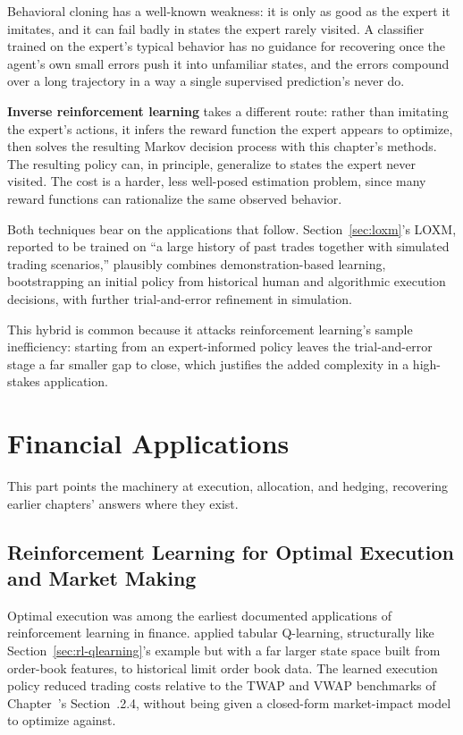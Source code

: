 \documentclass[../ai_in_finance]{subfiles}
\begin{document}
Behavioral cloning has a well-known weakness: it is only as good as the expert it imitates, and it can fail badly in states the expert rarely visited. A classifier trained on the expert's typical behavior has no guidance for recovering once the agent's own small errors push it into unfamiliar states, and the errors compound over a long trajectory in a way a single supervised prediction's never do.

\textbf{Inverse reinforcement learning} takes a different route: rather than imitating the expert's actions, it infers the reward function the expert appears to optimize, then solves the resulting Markov decision process with this chapter's methods. The resulting policy can, in principle, generalize to states the expert never visited. The cost is a harder, less well-posed estimation problem, since many reward functions can rationalize the same observed behavior.

Both techniques bear on the applications that follow. Section~\ref{sec:loxm}'s LOXM, reported to be trained on ``a large history of past trades together with simulated trading scenarios,'' plausibly combines demonstration-based learning, bootstrapping an initial policy from historical human and algorithmic execution decisions, with further trial-and-error refinement in simulation.

This hybrid is common because it attacks reinforcement learning's sample inefficiency: starting from an expert-informed policy leaves the trial-and-error stage a far smaller gap to close, which justifies the added complexity in a high-stakes application.

\section{Financial Applications}

This part points the machinery at execution, allocation, and hedging, recovering earlier chapters' answers where they exist.

\subsection{Reinforcement Learning for Optimal Execution and Market Making}
\label{sec:rl-execution}

Optimal execution was among the earliest documented applications of reinforcement learning in finance. \textcite{nevmyvaka2006reinforcement} applied tabular Q-learning, structurally like Section~\ref{sec:rl-qlearning}'s example but with a far larger state space built from order-book features, to historical limit order book data. The learned execution policy reduced trading costs relative to the TWAP and VWAP benchmarks of Chapter~'s Section~.2.4, without being given a closed-form market-impact model to optimize against.
\end{document}
